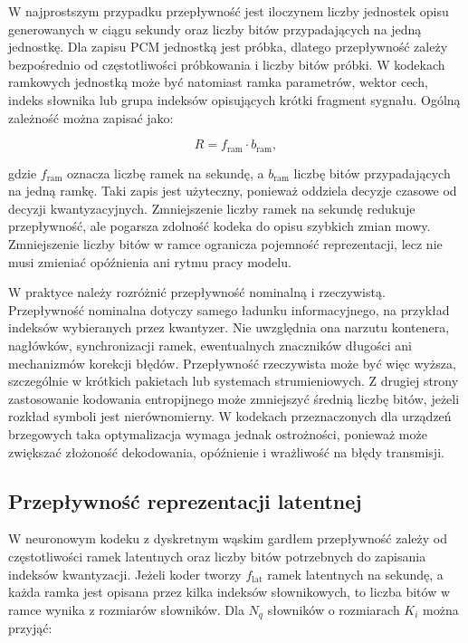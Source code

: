 W najprostszym przypadku przepływność jest iloczynem liczby jednostek opisu generowanych w ciągu sekundy oraz liczby bitów przypadających na jedną jednostkę. Dla zapisu PCM jednostką jest próbka, dlatego przepływność zależy bezpośrednio od częstotliwości próbkowania i liczby bitów próbki. W kodekach ramkowych jednostką może być natomiast ramka parametrów, wektor cech, indeks słownika lub grupa indeksów opisujących krótki fragment sygnału. Ogólną zależność można zapisać jako:

\begin{equation}
    R = f_{\mathrm{ram}} \cdot b_{\mathrm{ram}},
\end{equation}

gdzie \(f_{\mathrm{ram}}\) oznacza liczbę ramek na sekundę, a \(b_{\mathrm{ram}}\) liczbę bitów przypadających na jedną ramkę. Taki zapis jest użyteczny, ponieważ oddziela decyzje czasowe od decyzji kwantyzacyjnych. Zmniejszenie liczby ramek na sekundę redukuje przepływność, ale pogarsza zdolność kodeka do opisu szybkich zmian mowy. Zmniejszenie liczby bitów w ramce ogranicza pojemność reprezentacji, lecz nie musi zmieniać opóźnienia ani rytmu pracy modelu.

W praktyce należy rozróżnić przepływność nominalną i rzeczywistą. Przepływność nominalna dotyczy samego ładunku informacyjnego, na przykład indeksów wybieranych przez kwantyzer. Nie uwzględnia ona narzutu kontenera, nagłówków, synchronizacji ramek, ewentualnych znaczników długości ani mechanizmów korekcji błędów. Przepływność rzeczywista może być więc wyższa, szczególnie w krótkich pakietach lub systemach strumieniowych. Z drugiej strony zastosowanie kodowania entropijnego może zmniejszyć średnią liczbę bitów, jeżeli rozkład symboli jest nierównomierny. W kodekach przeznaczonych dla urządzeń brzegowych taka optymalizacja wymaga jednak ostrożności, ponieważ może zwiększać złożoność dekodowania, opóźnienie i wrażliwość na błędy transmisji.

\subsection{Przepływność reprezentacji latentnej}
\label{subsec:przeplywnosc-reprezentacji-latentnej}

W neuronowym kodeku z dyskretnym wąskim gardłem przepływność zależy od częstotliwości ramek latentnych oraz liczby bitów potrzebnych do zapisania indeksów kwantyzacji. Jeżeli koder tworzy \(f_{\mathrm{lat}}\) ramek latentnych na sekundę, a każda ramka jest opisana przez kilka indeksów słownikowych, to liczba bitów w ramce wynika z rozmiarów słowników. Dla \(N_q\) słowników o rozmiarach \(K_i\) można przyjąć:

